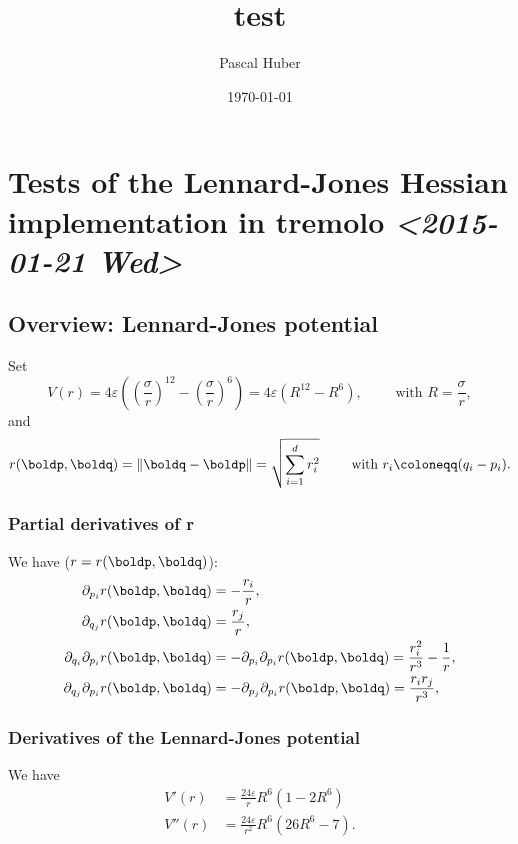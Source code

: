 \documentclass[11pt]{article}
\author{Pascal Huber}
\date{\today}
\title{test}
\begin{document}
\maketitle
\tableofcontents

\section{Tests of the Lennard-Jones Hessian implementation in tremolo \textit{<2015-01-21 Wed>}}
\label{sec-1}

\subsection{Overview: Lennard-Jones potential}
\label{sec-1-1}
Set
\begin{equation}
  \label{eq:1}
  V(r) =  4 \varepsilon \left( (\frac{\sigma}{r})^{12} -
    (\frac{\sigma}{r})^{6} \right) = 4 \varepsilon \left( R^{12} -
    R^6 \right),  \qquad \text{ with } R = \frac{\sigma}{r},
\end{equation}
and
\begin{equation}
  \label{eq:2}
  r(\boldp, \boldq) = \lVert \boldq - \boldp \rVert =
  \sqrt{\sum_{i=1}^d r_i^2} \qquad \text{ with } r_i \coloneqq (q_i - p_i).
\end{equation}

\subsubsection{Partial derivatives of r}
\label{sec-1-1-1}
We have (\(r = r(\boldp, \boldq)\)):
\begin{align}
\partial_{p_i} r(\boldp, \boldq) &= - \frac{r_i}{r},  \\
\partial_{q_j} r(\boldp, \boldq) &=  \frac{r_j}{r},  \\
\partial_{q_i}\partial_{p_i} r(\boldp, \boldq) &= - \partial_{p_i}\partial_{p_i} r(\boldp, \boldq) =  \frac{r_i^2}{r^3} - \frac{1}{r},  \\
\partial_{q_j}\partial_{p_i} r(\boldp, \boldq) &= - \partial_{p_j}\partial_{p_i} r(\boldp, \boldq) =  \frac{r_ir_j}{r^3}, \\
\end{align}

\subsubsection{Derivatives of the Lennard-Jones potential}
\label{sec-1-1-2}
We have
\begin{align}
  V'(r) &= \frac{24 \varepsilon}{r} R^6 \left(1 - 2 R^6\right) \\
  V''(r) &= \frac{24 \varepsilon}{r^2} R^6 \left( 26 R^6 - 7 \right).
\end{align}
\end{document}

